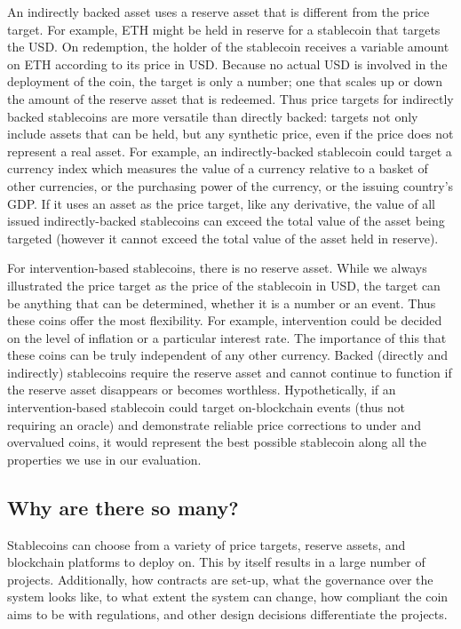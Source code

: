 An indirectly backed asset uses a reserve asset that is different from the price target. For example, ETH might be held in reserve for a stablecoin that targets the USD. On redemption, the holder of the stablecoin receives a variable amount on ETH according to its price in USD. Because no actual USD is involved in the deployment of the coin, the target is only a number; one that scales up or down the amount of the reserve asset that is redeemed. Thus price targets for indirectly backed stablecoins are more versatile than directly backed: targets not only include assets that can be held, but any synthetic price, even if the price does not represent a real asset. For example, an indirectly-backed stablecoin could target a currency index which measures the value of a currency relative to a basket of other currencies, or the purchasing power of the currency, or the issuing country's GDP. If it uses an asset as the price target, like any derivative, the value of all issued indirectly-backed stablecoins can exceed the total value of  the asset being targeted (however it cannot exceed the total value of the asset held in reserve).

For intervention-based stablecoins, there is no reserve asset. While we always illustrated the price target as the price of the stablecoin in USD, the target can be anything that can be determined, whether it is a number or an event. Thus these coins offer the most flexibility. For example, intervention could be decided on the level of inflation or a particular interest rate. The importance of this that these coins can be truly independent of any other currency. Backed (directly and indirectly) stablecoins require the reserve asset and cannot continue to function if the reserve asset disappears or becomes worthless. Hypothetically, if an intervention-based stablecoin could target on-blockchain events (thus not requiring an oracle) and demonstrate reliable price corrections to under and overvalued coins, it would represent the best possible stablecoin along all the properties we use in our evaluation. 


\subsection{Why are there so many?}

Stablecoins can choose from a variety of price targets, reserve assets, and blockchain platforms to deploy on. This by itself results in a large number of projects. Additionally, how contracts are set-up, what the governance over the system looks like, to what extent the system can change, how compliant the coin aims to be with regulations, and other design decisions differentiate the projects. 

